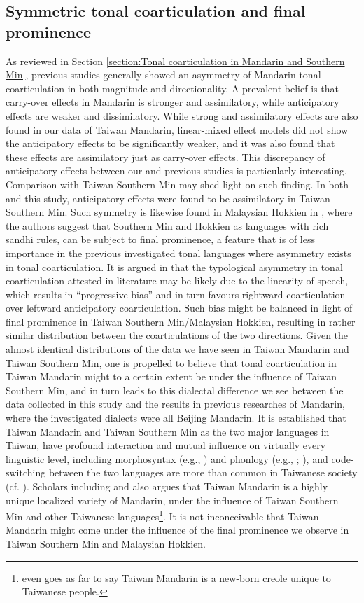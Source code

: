 \documentclass[12pt]{report}
\begin{document}
\begin{CJK}{UTF8}{bsmi}
\subsection{Symmetric tonal coarticulation and final prominence}
As reviewed in Section \ref{section:Tonal coarticulation in Mandarin and Southern Min}, previous studies generally showed an asymmetry of Mandarin tonal coarticulation in both magnitude and directionality. A prevalent belief is that carry-over effects in Mandarin is stronger and assimilatory, while anticipatory effects are weaker and dissimilatory. While strong and assimilatory effects are also found in our data of Taiwan Mandarin, linear-mixed effect models did not show the anticipatory effects to be significantly weaker, and it was also found that these effects are assimilatory just as carry-over effects. This discrepancy of anticipatory effects between our and previous studies is particularly interesting. Comparison with Taiwan Southern Min may shed light on such finding. In both \cite{Peng1997} and this study, anticipatory effects were found to be assimilatory in Taiwan Southern Min. Such symmetry is likewise found in Malaysian Hokkien in \cite{ChangHsieh2012}, where the authors suggest that Southern Min and Hokkien as languages with rich sandhi rules, can be subject to final prominence, a feature that is of less importance in the previous investigated tonal languages where asymmetry exists in tonal coarticulation. It is argued in \cite{ChangHsieh2012} that the typological asymmetry in tonal coarticulation attested in literature may be likely due to the linearity of speech, which results in ``progressive bias'' and in turn favours rightward coarticulation over leftward anticipatory coarticulation. Such bias might be balanced in light of final prominence in Taiwan Southern Min/Malaysian Hokkien, resulting in rather similar distribution between the coarticulations of the two directions. Given the almost identical distributions of the data we have seen in Taiwan Mandarin and Taiwan Southern Min, one is propelled to believe that tonal coarticulation in Taiwan Mandarin might to a certain extent be under the influence of Taiwan Southern Min, and in turn leads to this dialectal difference we see between the data collected in this study and the results in previous researches of Mandarin, where the investigated dialects were all Beijing Mandarin. It is established that Taiwan Mandarin and Taiwan Southern Min as the two major languages in Taiwan, have profound interaction and mutual influence on virtually every linguistic level, including morphosyntax (e.g., \citealp{Li2008}) and phonlogy (e.g., \citealp{ChuangFon2010}; \citealp{Li2010}), and code-switching between the two languages are more than common in Taiwanese society (cf. \citealp{Yang2021}). Scholars including \cite{Her2012} and \cite{Su2018} also argues that Taiwan Mandarin is a highly unique localized variety of Mandarin, under the influence of Taiwan Southern Min and other Taiwanese languages\footnote{\citeauthor{Her2012} even goes as far to say Taiwan Mandarin is a new-born creole  unique to Taiwanese people.}. It is not inconceivable that Taiwan Mandarin might come under the influence of the final prominence we observe in Taiwan Southern Min and Malaysian Hokkien.


\end{CJK}
\end{document}
